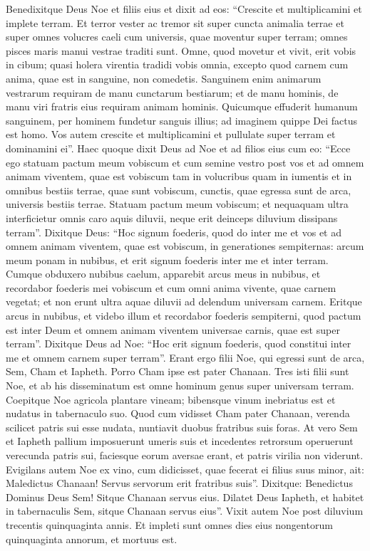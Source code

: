 \begin{biblechapter}  
\verse Benedixitque Deus Noe et filiis eius et dixit ad eos: “Crescite et multiplicamini et implete terram.
\verse Et terror vester ac tremor sit super cuncta animalia terrae et super omnes volucres caeli cum universis, quae moventur super terram; omnes pisces maris manui vestrae traditi sunt. 
\verse Omne, quod movetur et vivit, erit vobis in cibum; quasi holera virentia tradidi vobis omnia, 
\verse excepto quod carnem cum anima, quae est in sanguine, non comedetis. 
\verse Sanguinem enim animarum vestrarum requiram de manu cunctarum bestiarum; et de manu hominis, de manu viri fratris eius requiram animam hominis. 
\verse Quicumque effuderit humanum sanguinem, per hominem fundetur sanguis illius; ad imaginem quippe Dei factus est homo. 
\verse Vos autem crescite et multiplicamini et pullulate super terram et dominamini ei”. 
\verse Haec quoque dixit Deus ad Noe et ad filios eius cum eo: 
\verse “Ecce ego statuam pactum meum vobiscum et cum semine vestro post vos 
\verse et ad omnem animam viventem, quae est vobiscum tam in volucribus quam in iumentis et in omnibus bestiis terrae, quae sunt vobiscum, cunctis, quae egressa sunt de arca, universis bestiis terrae. 
\verse Statuam pactum meum vobiscum; et nequaquam ultra interficietur omnis caro aquis diluvii, neque erit deinceps diluvium dissipans terram”. 
\verse Dixitque Deus: “Hoc signum foederis, quod do inter me et vos et ad omnem animam viventem, quae est vobiscum, in generationes sempiternas: 
\verse arcum meum ponam in nubibus, et erit signum foederis inter me et inter terram. 
\verse Cumque obduxero nubibus caelum, apparebit arcus meus in nubibus, 
\verse et recordabor foederis mei vobiscum et cum omni anima vivente, quae carnem vegetat; et non erunt ultra aquae diluvii ad delendum universam carnem. 
\verse Eritque arcus in nubibus, et videbo illum et recordabor foederis sempiterni, quod pactum est inter Deum et omnem animam viventem universae carnis, quae est super terram”. 
\verse Dixitque Deus ad Noe: “Hoc erit signum foederis, quod constitui inter me et omnem carnem super terram”. 
\verse Erant ergo filii Noe, qui egressi sunt de arca, Sem, Cham et Iapheth. Porro Cham ipse est pater Chanaan. 
\verse Tres isti filii sunt Noe, et ab his disseminatum est omne hominum genus super universam terram.
\verse Coepitque Noe agricola plantare vineam; 
\verse bibensque vinum inebriatus est et nudatus in tabernaculo suo. 
\verse Quod cum vidisset Cham pater Chanaan, verenda scilicet patris sui esse nudata, nuntiavit duobus fratribus suis foras. 
\verse At vero Sem et Iapheth pallium imposuerunt umeris suis et incedentes retrorsum operuerunt verecunda patris sui, faciesque eorum aversae erant, et patris virilia non viderunt. 
\verse Evigilans autem Noe ex vino, cum didicisset, quae fecerat ei filius suus minor, 
\verse ait: Maledictus Chanaan! Servus servorum erit fratribus suis”. 
\verse Dixitque: Benedictus Dominus Deus Sem! Sitque Chanaan servus eius. 
\verse Dilatet Deus Iapheth, et habitet in tabernaculis Sem, sitque Chanaan servus eius”. 
\verse Vixit autem Noe post diluvium trecentis quinquaginta annis. 
\verse Et impleti sunt omnes dies eius nongentorum quinquaginta annorum, et mortuus est. 
\end{biblechapter}

